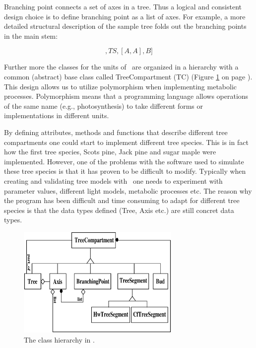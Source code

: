 \begin{displaymath}
[TS,BP,TS,BP,B]
\end{displaymath}

Branching  point connects a  set of axes  in a tree.  Thus a logical
and consistent design choice is to define branching point as a list of
axes. For   example, a more  detailed structural  description of the
sample tree folds out the branching points in the main stem:

\begin{displaymath}
[TS,[A,A],TS,[A,A],B]
\end{displaymath}
 
Further more the classes for the  units of \lignum\ are organized in a
hierarchy with  a common (abstract) base  class called TreeCompartment
(TC) (Figure \ref{fig:omt} on page \pageref{fig:omt}).  This design allows
us  to  utilize polymorphism  when  implementing metabolic  processes.
Polymorphism means  that a  programming language allows  operations of
the  same  name (e.g.,  photosynthesis)  to  take  different forms  or
implementations in different units.


By defining attributes, methods and  functions that describe different
tree   compartments  one  could start   to    implement different tree
species. This is in fact how the first tree  species, Scots pine, Jack
pine and sugar  maple were implemented.   However, one of the problems
with the software used to  simulate these tree  species is that it has
proven to   be difficult  to modify.     Typically  when creating  and
validating  tree models with \lignum\    one needs to experiment   with
parameter values, different light models, metabolic processes etc. The
reason why the program has been difficult  and time consuming to adapt
for different tree species is that  the data types defined (Tree, Axis
etc.) are still concret data types.

\begin{figure}[h]
\begin{center}
\includegraphics[width=0.7\textwidth,height=0.5\textwidth]{lignum-classes.eps}
\caption{\label{fig:omt} The class hierarchy in \lignum.}
\end{center}
\end{figure}

